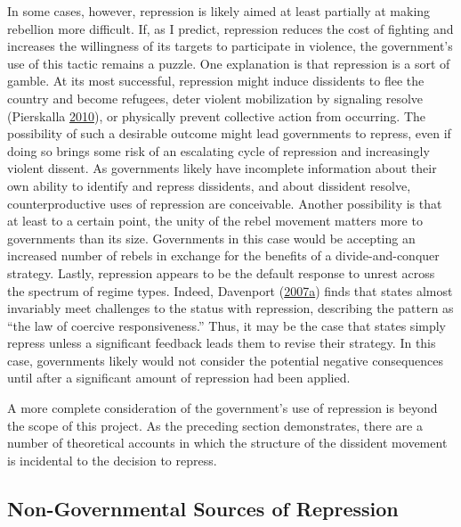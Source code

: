 \documentclass[12pt,]{book}
\theoremstyle{definition}
\theoremstyle{definition}
\theoremstyle{definition}
\theoremstyle{remark}
\begin{document}
In some cases, however, repression is likely aimed at least partially at
making rebellion more difficult. If, as I predict, repression reduces
the cost of fighting and increases the willingness of its targets to
participate in violence, the government's use of this tactic remains a
puzzle. One explanation is that repression is a sort of gamble. At its
most successful, repression might induce dissidents to flee the country
and become refugees, deter violent mobilization by signaling resolve
(Pierskalla \protect\hyperlink{ref-Pierskalla2010}{2010}), or physically
prevent collective action from occurring. The possibility of such a
desirable outcome might lead governments to repress, even if doing so
brings some risk of an escalating cycle of repression and increasingly
violent dissent. As governments likely have incomplete information about
their own ability to identify and repress dissidents, and about
dissident resolve, counterproductive uses of repression are conceivable.
Another possibility is that at least to a certain point, the unity of
the rebel movement matters more to governments than its size.
Governments in this case would be accepting an increased number of
rebels in exchange for the benefits of a divide-and-conquer strategy.
Lastly, repression appears to be the default response to unrest across
the spectrum of regime types. Indeed, Davenport
(\protect\hyperlink{ref-Davenport2007b}{2007}\protect\hyperlink{ref-Davenport2007b}{a})
finds that states almost invariably meet challenges to the status with
repression, describing the pattern as ``the law of coercive
responsiveness.'' Thus, it may be the case that states simply repress
unless a significant feedback leads them to revise their strategy. In
this case, governments likely would not consider the potential negative
consequences until after a significant amount of repression had been
applied.

A more complete consideration of the government's use of repression is
beyond the scope of this project. As the preceding section demonstrates,
there are a number of theoretical accounts in which the structure of the
dissident movement is incidental to the decision to repress.

\hypertarget{non-governmental-sources-of-repression}{%
\subsection{Non-Governmental Sources of
Repression}\label{non-governmental-sources-of-repression}}
\end{document}
